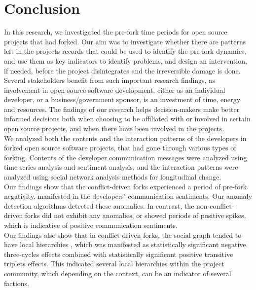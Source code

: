 \documentclass[12pt]{report}
\begin{document}
\doublespacing

\pagebreak
\section{Conclusion}
\label{Discussion}

In this research, we investigated the pre-fork time periods for open source projects that had forked. Our aim was to investigate whether there are patterns left in the projects records that could be used to identify the pre-fork dynamics, and use them as key indicators to identify problems, and design an intervention, if needed, before the project disintegrates and the irreversible damage is done. \\

Several stakeholders benefit from such important research findings, as involvement in open source software development, either as an individual developer, or a business/government sponsor, is an investment of time, energy and resources. The findings of our research helps decision-makers make better informed decisions both when choosing to be affiliated with or involved in certain open source projects, and when there have been involved in the projects.\\

We analyzed both the contents and the interaction patterns of the developers in forked open source software projects, that had gone through various types of forking. Contents of the developer communication messages were analyzed using time series analysis and sentiment analysis, and the interaction patterns were analyzed using social network analysis methods for longitudinal change. \\

Our findings show that the conflict-driven forks experienced a period of pre-fork negativity, manifested in the developers' communication sentiments. Our anomaly detection algorithms detected these anomalies. In contrast, the non-conflict-driven forks did not exhibit any anomalies, or showed periods of positive spikes, which is indicative of positive communication sentiments. \\

Our findings also show that in conflict-driven forks, the social graph tended to have local hierarchies \cite{Snijders2010}, which was manifested as statistically significant negative three-cycles effects combined with statistically significant positive transitive triplets effects. This indicated several local hierarchies within the project community, which depending on the context, can be an indicator of several factions. \\ 
\end{document}
